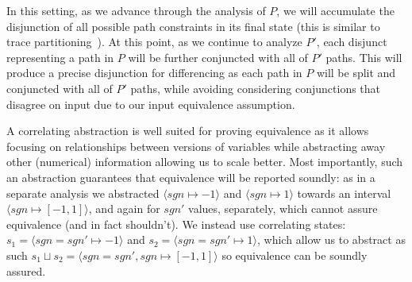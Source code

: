 In this setting, as we advance through the analysis of $P$, we will accumulate the disjunction of all possible path constraints in its final state (this is similar to trace partitioning~\cite{MauborgneRival07}). At this point, as we continue to analyze $P'$, each disjunct representing a path in $P$ will be further conjuncted with all of $P'$ paths. This will produce a precise disjunction for differencing as each path in $P$ will be split and conjuncted with all of $P'$ paths, while avoiding considering conjunctions that disagree on input due to our input equivalence assumption.


A correlating abstraction is well suited for proving equivalence as it allows focusing on relationships between versions of variables while abstracting away other (numerical) information allowing us to scale better. Most importantly, such an abstraction guarantees that equivalence will be reported soundly: as in a separate analysis we abstracted $\langle sgn \mapsto -1 \rangle$ and $\langle sgn \mapsto 1 \rangle$ towards an interval $\langle sgn \mapsto [-1,1] \rangle$, and again for $sgn'$ values, separately, which cannot assure equivalence (and in fact shouldn't). We instead use correlating states: $s_1 = \langle sgn = sgn' \mapsto -1 \rangle$ and $s_2 = \langle sgn = sgn' \mapsto 1 \rangle$, which allow us to abstract as such $s_1 \sqcup s_2 = \langle sgn = sgn', sgn \mapsto [-1,1] \rangle$ so equivalence can be soundly assured.




